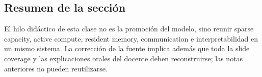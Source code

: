 \subsection{Resumen de la sección}

El hilo didáctico de esta clase no es la promoción del modelo, sino reunir sparse capacity, active compute, resident memory, communication e interpretabilidad en un mismo sistema. La corrección de la fuente implica además que toda la slide coverage y las explicaciones orales del docente deben reconstruirse; las notas anteriores no pueden reutilizarse.

